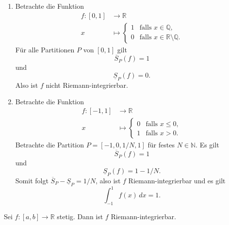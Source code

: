 \documentclass[../main.tex]{subfiles}
\begin{document}
\begin{examples}
  \leavevmode
  \begin{enumerate}[(1)]
    \item Betrachte die Funktion
      \begin{align*}
        f \colon [0, 1] & \to \mathbb{R} \\
        x & \mapsto
        \begin{cases}
          1 & \text{falls $x \in \mathbb{Q}$},\\
          0 & \text{falls $x \in \mathbb{R} \setminus \mathbb{Q}$}.
        \end{cases}
      \end{align*}
      Für alle Partitionen $P$ von $[0, 1]$ gilt
      \[
        \overline S_P(f) = 1
      \]
      und
      \[
        \underline S_P(f) = 0.
      \]
      Also ist $f$ nicht Riemann-integrierbar.
    \item Betrachte die Funktion
      \begin{align*}
        f \colon [-1, 1] & \to \mathbb{R} \\
        x & \mapsto
        \begin{cases}
          0 & \text{falls $x \leq 0$},\\
          1 & \text{falls $x > 0$}.
        \end{cases}
      \end{align*}
      Betrachte die Partition
      $P = [-1, 0, 1/N, 1]$ für festes $N \in \mathbb{N}$.
      Es gilt
      \[
        \overline S_P(f) = 1
      \]
      und
      \[
        \underline S_P(f) = 1 - 1/N.
      \]
      Somit folgt $\overline S_P - \underline S_P = 1/N$,
      also ist $f$ Riemann-integrierbar und es gilt
      \[
        \int_{-1}^{1} f(x) \, dx = 1.
      \]
  \end{enumerate}
\end{examples}

\begin{theorem}\label{thm:continuous-integrable}
  Sei $f \colon [a, b] \to \mathbb{R}$ stetig. Dann ist $f$
  Riemann-integrierbar.
\end{theorem}
\end{document}
